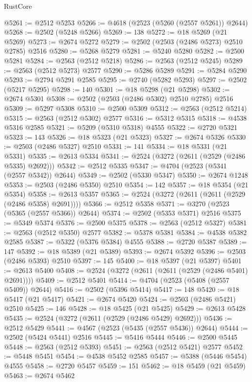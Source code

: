 \begin{lexlean}{RustCore}
\begin{coremodule}
@5261 := @2512 @5253
@5266 := @4618 (@2523 (@5260 (@2557 @5261)) @2644)
@5268 := @2502 (@5248 @5266)
@5269 := 138
@5272 := @18 @5269 (@21 @5269)
@5273 := @2674 @5272
@5279 := @2502 (@2503 (@2486 @5273) @2510 @2785) @2516
@5280 := @5268 @5279
@5281 := @5240 @5280
@5282 := @2500 @5281
@5284 := @2563 (@2512 @5218)
@5286 := @2563 (@2512 @5245)
@5289 := @2563 (@2512 @5273) @2577
@5290 := @5286 @5289
@5291 := @5284 @5290
@5293 := @2794 @5291 @2585
@5295 := @2740 (@5282 @5293)
@5297 := @2502 (@5217 @5295)
@5298 := 140
@5301 := @18 @5298 (@21 @5298)
@5302 := @2674 @5301
@5308 := @2502 (@2503 (@2486 @5302) @2510 @2785) @2516
@5309 := @5297 @5308
@5310 := @2500 @5309
@5312 := @2563 (@2512 @5214)
@5315 := @2563 (@2512 @5302) @2577
@5316 := @5312 @5315
@5318 := @4538 @5316 @2585
@5321 := @5209 (@5310 @5318) @4555
@5322 := @2720 @5321
@5323 := 143
@5326 := @18 @5323 (@21 @5323)
@5327 := @2674 @5326
@5330 := @2503 (@2486 @5327) @2510
@5331 := 141
@5334 := @18 @5331 (@21 @5331)
@5335 := @2613 @5334
@5341 := @2524 (@3272 (@2611 (@2529 (@2486 @5335) @2692)))
@5342 := @2512 @5335
@5347 := @4704 (@2523 (@5341 (@2557 @5342)) @2644)
@5349 := @2502 (@5330 @5347)
@5350 := @2674 @1248
@5353 := @2503 (@2486 @5350) @2510
@5354 := 142
@5357 := @18 @5354 (@21 @5354)
@5358 := @2613 @5357
@5365 := @2524 (@3272 (@2611 (@2611 (@2529 (@2486 @5358) @2691))))
@5366 := @2512 @5358
@5371 := @3270 (@2523 (@5365 (@2557 @5366)) @2644)
@5374 := @2502 (@5353 @5371) @2516
@5375 := @5349 @5374
@5376 := @2500 @5375
@5378 := @2563 (@2512 @5327)
@5381 := @2563 (@2512 @5350) @2577
@5382 := @5378 @5381
@5384 := @4538 @5382 @2585
@5387 := @5322 (@5376 @5384) @4555
@5388 := @2720 @5387
@5389 := 147
@5392 := @18 @5389 (@21 @5389)
@5393 := @2674 @5392
@5396 := @2503 (@2486 @5393) @2510
@5397 := 145
@5400 := @18 @5397 (@21 @5397)
@5401 := @2613 @5400
@5408 := @2524 (@3272 (@2611 (@2611 (@2529 (@2486 @5401) @2691))))
@5409 := @2512 @5401
@5414 := @4704 (@2523 (@5408 (@2557 @5409)) @2644)
@5416 := @2502 (@5396 @5414)
@5417 := 148
@5420 := @18 @5417 (@21 @5417)
@5421 := @2674 @5420
@5424 := @2503 (@2486 @5421) @2510
@5425 := 146
@5428 := @18 @5425 (@21 @5425)
@5429 := @2613 @5428
@5435 := @2524 (@3272 (@2611 (@2529 (@2486 @5429) @2692)))
@5436 := @2512 @5429
@5441 := @4567 (@2523 (@5435 (@2557 @5436)) @2644)
@5444 := @2502 (@5424 @5441) @2516
@5445 := @5416 @5444
@5446 := @2500 @5445
@5448 := @2563 (@2512 @5393)
@5451 := @2563 (@2512 @5421) @2577
@5452 := @5448 @5451
@5454 := @4538 @5452 @2585
@5457 := @5388 (@5446 @5454) @4555
@5458 := @2720 @5457
@5459 := 151
@5462 := @18 @5459 (@21 @5459)
@5463 := @2674 @5462

\end{coremodule}
\end{lexlean}
